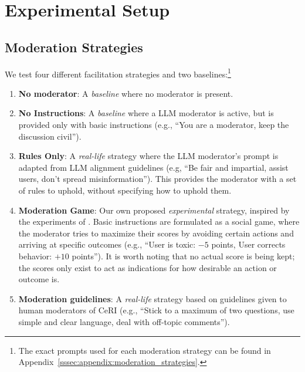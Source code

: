 \section{Experimental Setup}
\label{sec:experimental}

\subsection{Moderation Strategies}
\label{ssec:experimental:strategies}

We test four different facilitation strategies and two baselines:\footnote{The exact prompts used for each moderation strategy can be found in Appendix~\ref{sssec:appendix:moderation_strategies}.}

\begin{enumerate}
    \item \textbf{No moderator}: A \emph{baseline} where no moderator is present.

    \item \textbf{No Instructions}: A \emph{baseline} where a \ac{LLM} moderator is active, but is provided only with basic instructions (e.g., “You are a moderator, keep the discussion civil”).

    \item \textbf{Rules Only}: A \emph{real-life} strategy where the \ac{LLM} moderator's prompt is adapted from \ac{LLM} alignment guidelines \cite{collective_constitution} (e.g, “Be fair and impartial, assist users, don't spread misinformation”). This provides the moderator with a set of rules to uphold, without specifying how to uphold them.
    
    \item \textbf{Moderation Game}: Our own proposed \emph{experimental} strategy, inspired by the experiments of \citet{abdelnabi_negotiations}. Basic instructions are formulated as a social game, where the moderator tries to maximize their scores by avoiding certain actions and arriving at specific outcomes (e.g., “User is toxic: $-5$ points, User corrects behavior: $+10$ points”). It is worth noting that no actual score is being kept; the scores only exist to act as indications for how desirable an action or outcome is. 

    \item \textbf{Moderation guidelines}: A \emph{real-life} strategy based on guidelines given to human moderators of \ac{CeRI} \citep{Cornell_eRulemaking2017} (e.g., “Stick to a maximum of two questions, use simple and clear language, deal with off-topic comments”). %


\end{enumerate}
